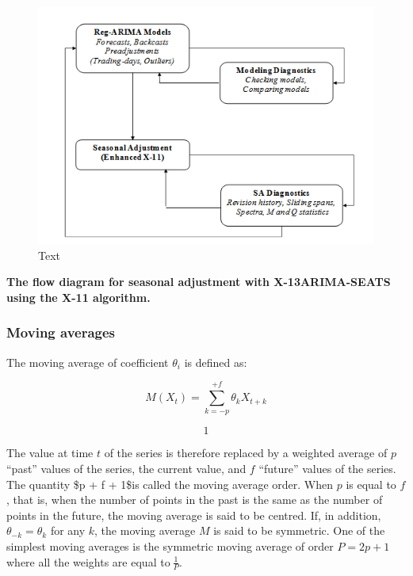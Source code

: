 \documentclass[
  letterpaper,
  DIV=11,
  numbers=noendperiod]{scrreprt}
\begin{document}
\begin{figure}

{\centering \includegraphics{./All_images/UG_A_image13.png}

}

\caption{Text}

\end{figure}

\textbf{The flow diagram for seasonal adjustment with X-13ARIMA-SEATS
using the X-11 algorithm.}

\hypertarget{moving-averages}{%
\subsubsection{Moving averages}\label{moving-averages}}

The moving average of coefficient \(\theta_{i}\) is defined as:

\[M\left( X_{t} \right) = \sum_{k = - p}^{+ f}\theta_{k}X_{t + k}\]

\[1\]

The value at time \(t\) of the series is therefore replaced by a
weighted average of \(p\) ``past'' values of the series, the current
value, and \(f\) ``future'' values of the series. The quantity \$p + f +
1\$is called the moving average order. When \(p\) is equal to \(f\),
that is, when the number of points in the past is the same as the number
of points in the future, the moving average is said to be centred. If,
in addition, \(\theta_{- k} = \theta_{k}\) for any \(k\), the moving
average \(M\) is said to be symmetric. One of the simplest moving
averages is the symmetric moving average of order \(P = 2p + 1\) where
all the weights are equal to\(\ \frac{1}{P}\).
\end{document}
